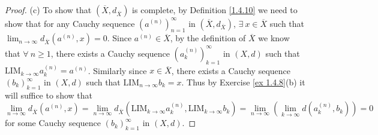 \begin{proof}{(c)}
    To show that \((\overline{X}, d_{\overline{X}})\) is complete, by Definition \ref{1.4.10} we need to show that for any Cauchy sequence \((a^{(n)})_{n = 1}^\infty\) in \((\overline{X}, d_{\overline{X}})\), \(\exists\ x \in \overline{X}\) such that \(\lim_{n \to \infty} d_{\overline{X}}(a^{(n)}, x) = 0\).
    Since \(a^{(n)} \in \overline{X}\), by the definition of \(\overline{X}\) we know that \(\forall\ n \geq 1\), there exists a Cauchy sequence \((a_k^{(n)})_{k = 1}^\infty\) in \((X, d)\) such that \(\text{LIM}_{k \to \infty} a_k^{(n)} = a^{(n)}\).
    Similarly since \(x \in \overline{X}\), there exists a Cauchy sequence \((b_k)_{k = 1}^{\infty}\) in \((X, d)\) such that \(\text{LIM}_{n \to \infty} b_k = x\).
    Thus by Exercise \ref{ex 1.4.8}(b) it will suffice to show that
    \[
        \lim_{n \to \infty} d_{\overline{X}}(a^{(n)}, x) = \lim_{n \to \infty} d_{\overline{X}}(\text{LIM}_{k \to \infty} a_k^{(n)}, \text{LIM}_{k \to \infty} b_k) = \lim_{n \to \infty} (\lim_{k \to \infty} d(a_k^{(n)}, b_k)) = 0
    \]
    for some Cauchy sequence \((b_k)_{k = 1}^{\infty}\) in \((X, d)\).


\end{proof}
